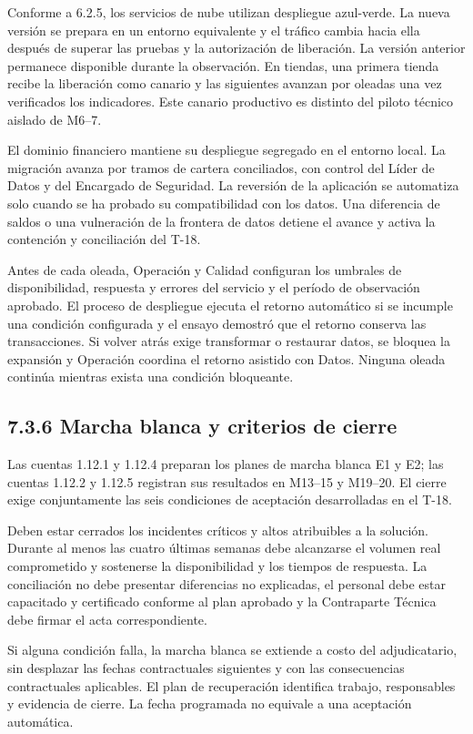 \documentclass[11pt]{article}
\begin{document}
Conforme a 6.2.5, los servicios de nube utilizan despliegue azul-verde. La nueva versión se prepara en un entorno equivalente y el tráfico cambia hacia ella después de superar las pruebas y la autorización de liberación. La versión anterior permanece disponible durante la observación. En tiendas, una primera tienda recibe la liberación como canario y las siguientes avanzan por oleadas una vez verificados los indicadores. Este canario productivo es distinto del piloto técnico aislado de M6--7.

El dominio financiero mantiene su despliegue segregado en el entorno local. La migración avanza por tramos de cartera conciliados, con control del Líder de Datos y del Encargado de Seguridad. La reversión de la aplicación se automatiza solo cuando se ha probado su compatibilidad con los datos. Una diferencia de saldos o una vulneración de la frontera de datos detiene el avance y activa la contención y conciliación del T-18.

Antes de cada oleada, Operación y Calidad configuran los umbrales de disponibilidad, respuesta y errores del servicio y el período de observación aprobado. El proceso de despliegue ejecuta el retorno automático si se incumple una condición configurada y el ensayo demostró que el retorno conserva las transacciones. Si volver atrás exige transformar o restaurar datos, se bloquea la expansión y Operación coordina el retorno asistido con Datos. Ninguna oleada continúa mientras exista una condición bloqueante.

\subsection{7.3.6 Marcha blanca y criterios de cierre}

Las cuentas 1.12.1 y 1.12.4 preparan los planes de marcha blanca E1 y E2; las cuentas 1.12.2 y 1.12.5 registran sus resultados en M13--15 y M19--20. El cierre exige conjuntamente las seis condiciones de aceptación desarrolladas en el T-18.

Deben estar cerrados los incidentes críticos y altos atribuibles a la solución. Durante al menos las cuatro últimas semanas debe alcanzarse el volumen real comprometido y sostenerse la disponibilidad y los tiempos de respuesta. La conciliación no debe presentar diferencias no explicadas, el personal debe estar capacitado y certificado conforme al plan aprobado y la Contraparte Técnica debe firmar el acta correspondiente.

Si alguna condición falla, la marcha blanca se extiende a costo del adjudicatario, sin desplazar las fechas contractuales siguientes y con las consecuencias contractuales aplicables. El plan de recuperación identifica trabajo, responsables y evidencia de cierre. La fecha programada no equivale a una aceptación automática.
\end{document}
